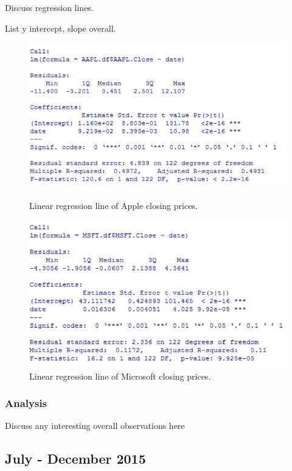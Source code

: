 \documentclass[paper=a4, fontsize=11pt]{scrartcl} %
\numberwithin{equation}{section} %
\numberwithin{figure}{section} %
\numberwithin{table}{section} %
\begin{document}
Discuss regression lines. 

List y intercept, slope overall. 

\begin{figure}[!htb]
  \includegraphics[width=\linewidth]{graph/aapl_reg_9.png}
  \caption{Linear regression line of Apple closing prices.}
\endminipage\hfill
{}
  \includegraphics[width=\linewidth]{graph/msft_reg_9.png}
  \caption{Linear regression line of Microsoft closing prices.}
\endminipage\hfill
\end{figure}


\subsubsection{Analysis}
Discuss any interesting overall observations here


\subsection{July - December  2015}
\end{document}
